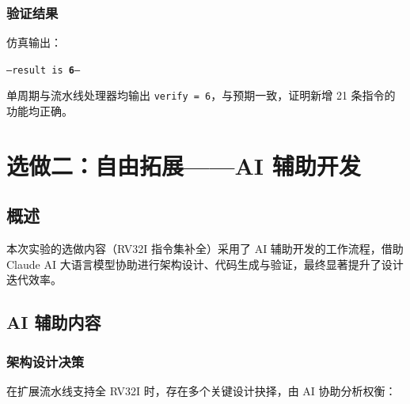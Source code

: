 \documentclass[12pt,hyperref,a4paper,UTF8]{ctexart}
\begin{document}
\subsubsection{验证结果}

仿真输出：
\begin{center}
\texttt{---\quad result is \textbf{6}\quad ---}
\end{center}

单周期与流水线处理器均输出 \texttt{verify = 6}，与预期一致，证明新增 21 条指令的功能均正确。

\section{选做二：自由拓展——AI 辅助开发}

\subsection{概述}

本次实验的选做内容（RV32I 指令集补全）采用了 AI 辅助开发的工作流程，借助 Claude AI 大语言模型协助进行架构设计、代码生成与验证，最终显著提升了设计迭代效率。

\subsection{AI 辅助内容}

\subsubsection{架构设计决策}

在扩展流水线支持全 RV32I 时，存在多个关键设计抉择，由 AI 协助分析权衡：
\end{document}
